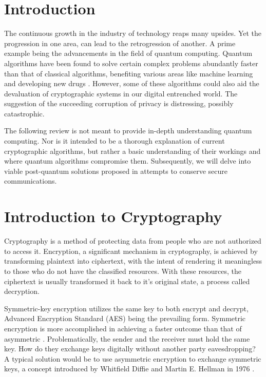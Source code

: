 \section{Introduction}
The continuous growth in the industry of technology reaps many upsides. 
Yet the progression in one area, can lead to the retrogression of another.
A prime example being the advancements in the field of quantum computing.
Quantum algorithms have been found to solve certain complex problems abundantly faster than that of classical algorithms, benefiting various areas like machine learning \cite{Sec_Risk} and developing new drugs \cite{Q_Comp_Real}. 
However, some of these algorithms could also aid the devaluation of cryptographic systems in our digital entrenched world. The suggestion of the succeeding corruption of privacy is distressing, possibly catastrophic. 



The following review is not meant to provide in-depth understanding quantum computing. Nor is it intended to be a thorough explanation of current cryptographic algorithms, but rather a basic understanding of their workings and where quantum algorithms compromise them.
Subsequently, we will delve into viable post-quantum solutions proposed in attempts to conserve secure communications.

\section{Introduction to Cryptography}
Cryptography is a method of protecting data from people who are not authorized to access it. Encryption, a significant mechanism in cryptography, is achieved by transforming plaintext into ciphertext, with the intent of rendering it meaningless to those who do not have the classified resources. With these resources, the ciphertext is usually transformed it back to it's original state, a process called decryption.

Symmetric-key encryption utilizes the same key to both encrypt and decrypt, Advanced Encryption Standard (AES) being the prevailing form. Symmetric encryption is more accomplished in achieving a faster outcome than that of asymmetric \cite{Understanding_Cryptog}. Problematically, the sender and the receiver must hold the same key. How do they exchange keys digitally without another party eavesdropping? A typical solution would be to use asymmetric encryption to exchange symmetric keys, a concept introduced by Whitfield Diffie and Martin E. Hellman in 1976 \cite{PKC}.

